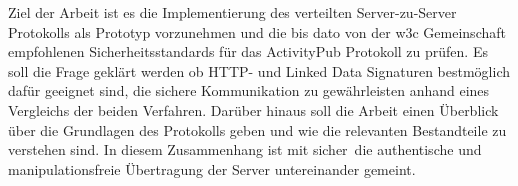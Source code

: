 {	%
	Ziel der Arbeit ist es die Implementierung des verteilten Server-zu-Server Protokolls als Prototyp vorzunehmen und die bis dato von der \gls{w3c} Gemeinschaft empfohlenen Sicherheitsstandards für das ActivityPub Protokoll zu prüfen. Es soll die Frage geklärt werden ob HTTP- und Linked Data Signaturen bestmöglich dafür geeignet sind, die sichere Kommunikation zu gewährleisten anhand eines Vergleichs der beiden Verfahren. Darüber hinaus soll die Arbeit einen Überblick über die Grundlagen des Protokolls geben und wie die relevanten Bestandteile zu verstehen sind. In diesem Zusammenhang ist mit \glqq sicher\grqq~die authentische und manipulationsfreie Übertragung der Server untereinander gemeint.\\
		
}

